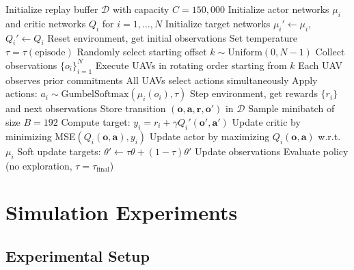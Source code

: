 \documentclass[conference]{IEEEtran}
\begin{document}
\begin{algorithm}[t]
\caption{MADDPG Training for UAV Swarm Frequency Planning}
\label{alg:maddpg}
\begin{algorithmic}[1]
\STATE Initialize replay buffer $\mathcal{D}$ with capacity $C = 150,000$
\STATE Initialize actor networks $\mu_i$ and critic networks $Q_i$ for $i=1,\ldots,N$
\STATE Initialize target networks $\mu_i' \leftarrow \mu_i$, $Q_i' \leftarrow Q_i$
    \STATE Reset environment, get initial observations
    \STATE Set temperature $\tau = \tau(\text{episode})$
    \STATE Randomly select starting offset $k \sim \text{Uniform}(0, N-1)$
        \STATE Collect observations $\{o_i\}_{i=1}^N$
            \STATE Execute UAVs in rotating order starting from $k$
            \STATE Each UAV observes prior commitments
        \ELSE
            \STATE All UAVs select actions simultaneously
        \ENDIF
        \STATE Apply actions: $a_i \sim \text{GumbelSoftmax}(\mu_i(o_i), \tau)$
        \STATE Step environment, get rewards $\{r_i\}$ and next observations
        \STATE Store transition $(\mathbf{o}, \mathbf{a}, \mathbf{r}, \mathbf{o}')$ in $\mathcal{D}$
            \STATE Sample minibatch of size $B = 192$
                \STATE Compute target: $y_i = r_i + \gamma Q_i'(\mathbf{o}', \mathbf{a}')$
                \STATE Update critic by minimizing MSE$(Q_i(\mathbf{o}, \mathbf{a}), y_i)$
                \STATE Update actor by maximizing $Q_i(\mathbf{o}, \mathbf{a})$ w.r.t. $\mu_i$
                \STATE Soft update targets: $\theta' \leftarrow \tau \theta + (1-\tau) \theta'$
            \ENDFOR
        \ENDIF
        \STATE Update observations
    \ENDFOR
        \STATE Evaluate policy (no exploration, $\tau = \tau_{\text{final}}$)
    \ENDIF
\ENDFOR
\end{algorithmic}
\end{algorithm}

\section{Simulation Experiments}

\subsection{Experimental Setup}
\end{document}
